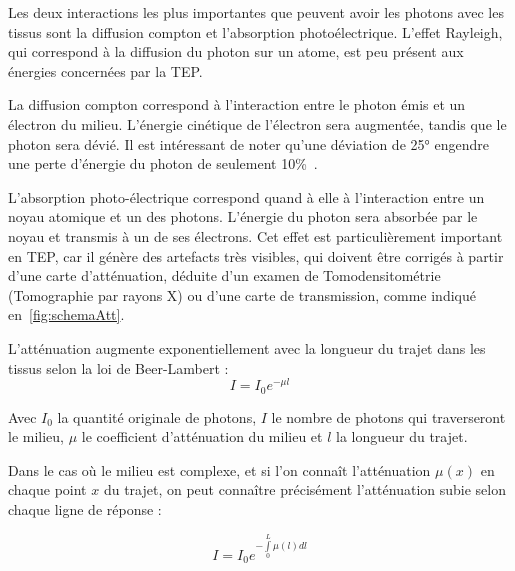 Les deux interactions les plus importantes que peuvent avoir les photons avec les tissus sont la diffusion compton et l'absorption photoélectrique. L'effet Rayleigh, qui correspond à la diffusion du photon sur un atome, est peu présent aux énergies concernées par la TEP. 

La diffusion compton correspond à l'interaction entre le photon émis et un électron du milieu. L'énergie cinétique de l'électron sera augmentée, tandis que le photon sera dévié. Il est intéressant de noter qu'une déviation de 25° engendre une perte d'énergie du photon de seulement 10\%~\cite{evans1955atomic}.

L'absorption photo-électrique correspond quand à elle à l'interaction entre un noyau atomique et un des photons. L'énergie du photon sera absorbée par le noyau et transmis à un de ses électrons. Cet effet est particulièrement important en TEP, car il génère des artefacts très visibles, qui doivent être corrigés à partir d'une carte d'atténuation, déduite d'un examen de Tomodensitométrie (Tomographie par rayons X) ou d'une carte de transmission, comme indiqué en~\ref{fig:schemaAtt}.


L'atténuation augmente exponentiellement avec la longueur du trajet dans les tissus selon la loi de Beer-Lambert :
\begin{equation}
I = I_0 e^{-\mu l}
\end{equation}

Avec $I_0$ la quantité originale de photons, $I$ le nombre de photons qui traverseront le milieu, $\mu$ le coefficient d'atténuation du milieu et $l$ la longueur du trajet. 

Dans le cas où le milieu est complexe, et si l'on connaît l'atténuation $\mu(x)$ en chaque point $x$ du trajet, on peut connaître précisément l'atténuation subie selon chaque ligne de réponse :

\begin{equation}
I = I_0 e^{- \int\limits^L_0 \mu(l) dl}
\end{equation}


